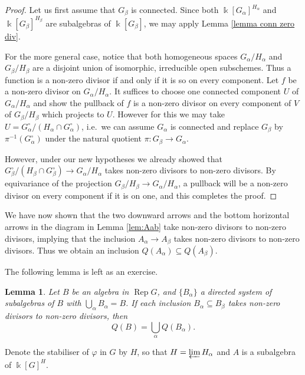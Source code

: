\documentclass[11pt]{amsart}
\def\bk{\Bbbk}
\def\Rep{\operatorname{Rep}}
\def\sub{\subseteq}
\newtheorem{lemma}[thm]{Lemma}
\theoremstyle{definition}
\theoremstyle{remark}
\numberwithin{equation}{section}
\begin{document}
	\begin{proof}
		 Let us first assume that $G_{\beta}$ is connected.  Since both $\Bbbk[G_{\alpha}]^{H_{\alpha}}$ and $\Bbbk[G_{\beta}]^{H_{\beta}}$ are subalgebras of $\Bbbk[G_{\beta}]$, we may apply Lemma \ref{lemma conn zero div}.
		
		For the more general case, notice that both homogeneous spaces $G_{\alpha}/H_{\alpha}$ and $G_{\beta}/H_{\beta}$ are a disjoint union of isomorphic, irreducible open subschemes.  Thus a function is a non-zero divisor if and only if it is so on every component.  Let $f$ be a non-zero divisor on $G_{\alpha}/H_{\alpha}$.  It suffices to choose one connected component $U$ of $G_{\alpha}/H_{\alpha}$ and show the pullback of $f$ is a non-zero divisor on every component of $V$ of $G_{\beta}/H_{\beta}$ which projects to $U$.  However for this we may take $U=G_{\alpha}^\circ/(H_{\alpha}\cap G_{\alpha}^\circ)$, i.e.~we can assume $G_{\alpha}$ is connected and replace $G_{\beta}$ by $\pi^{-1}(G_{\alpha}^\circ)$ under the natural quotient $\pi:G_{\beta}\to G_{\alpha}$.
		
		However, under our new hypotheses we already showed that $G_{\beta}^\circ/(H_{\beta}\cap G_{\beta}^\circ)\to G_{\alpha}/H_{\alpha}$ takes non-zero divisors to non-zero divisors.  By equivariance of the projection $G_{\beta}/H_{\beta}\to G_{\alpha}/H_{\alpha}$, a pullback will be a non-zero divisor on every component if it is on one, and this completes the proof.
	\end{proof}
	
	We have now shown that the two downward arrows and the bottom horizontal arrows in the diagram in Lemma \ref{lem:Aab} take non-zero divisors to non-zero divisors, implying that the inclusion $A_{\alpha}\to A_{\beta}$ takes non-zero divisors to non-zero divisors.  Thus we obtain an inclusion $Q(A_{\alpha})\sub Q(A_{\beta})$.   

    The following lemma is left as an exercise.

    \begin{lemma}\label{lemma exercise}
        Let $B$ be an algebra in $\Rep G$, and $\{B_{\alpha}\}$ a directed system of subalgebras of $B$ with $\bigcup\limits_{\alpha}B_{\alpha}=B$.  If each inclusion $B_{\alpha}\sub B_{\beta}$ takes non-zero divisors to non-zero divisors, then 
        \[
        Q(B)=\bigcup\limits_{\alpha}Q(B_{\alpha}).
        \]
    \end{lemma}


Denote the stabiliser of $\varphi$ in $G$ by $H$, so that $H=\varprojlim H_\alpha$ and $A$ is a subalgebra of $\bk[G]^H$.
	
\end{document}
